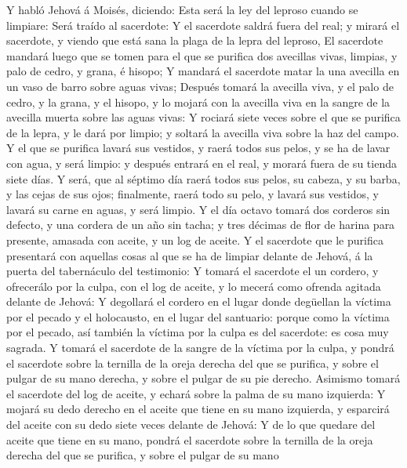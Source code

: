  Y habló Jehová á Moisés, diciendo:  Esta será
la ley del leproso cuando se limpiare: Será traído al sacerdote:
 Y el sacerdote saldrá fuera del real; y mirará el
sacerdote, y viendo que está sana la plaga de la lepra del leproso,
 El sacerdote mandará luego que se tomen para el que se
purifica dos avecillas vivas, limpias, y palo de cedro, y grana, é
hisopo;  Y mandará el sacerdote matar la una avecilla en un
vaso de barro sobre aguas vivas;  Después tomará la avecilla
viva, y el palo de cedro, y la grana, y el hisopo, y lo mojará con la
avecilla viva en la sangre de la avecilla muerta sobre las aguas vivas:
 Y rociará siete veces sobre el que se purifica de la lepra,
y le dará por limpio; y soltará la avecilla viva sobre la haz del campo.
 Y el que se purifica lavará sus vestidos, y raerá todos sus
pelos, y se ha de lavar con agua, y será limpio: y después entrará en el
real, y morará fuera de su tienda siete días.  Y será, que
al séptimo día raerá todos sus pelos, su cabeza, y su barba, y las cejas
de sus ojos; finalmente, raerá todo su pelo, y lavará sus vestidos, y
lavará su carne en aguas, y será limpio.  Y el día octavo
tomará dos corderos sin defecto, y una cordera de un año sin tacha; y
tres décimas de flor de harina para presente, amasada con aceite, y un
log de aceite.  Y el sacerdote que le purifica presentará
con aquellas cosas al que se ha de limpiar delante de Jehová, á la
puerta del tabernáculo del testimonio:  Y tomará el
sacerdote el un cordero, y ofrecerálo por la culpa, con el log de
aceite, y lo mecerá como ofrenda agitada delante de Jehová:
 Y degollará el cordero en el lugar donde degüellan la
víctima por el pecado y el holocausto, en el lugar del santuario: porque
como la víctima por el pecado, así también la víctima por la culpa es
del sacerdote: es cosa muy sagrada.  Y tomará el sacerdote
de la sangre de la víctima por la culpa, y pondrá el sacerdote sobre la
ternilla de la oreja derecha del que se purifica, y sobre el pulgar de
su mano derecha, y sobre el pulgar de su pie derecho. 
Asimismo tomará el sacerdote del log de aceite, y echará sobre la palma
de su mano izquierda:  Y mojará su dedo derecho en el
aceite que tiene en su mano izquierda, y esparcirá del aceite con su
dedo siete veces delante de Jehová:  Y de lo que quedare
del aceite que tiene en su mano, pondrá el sacerdote sobre la ternilla
de la oreja derecha del que se purifica, y sobre el pulgar de su mano
